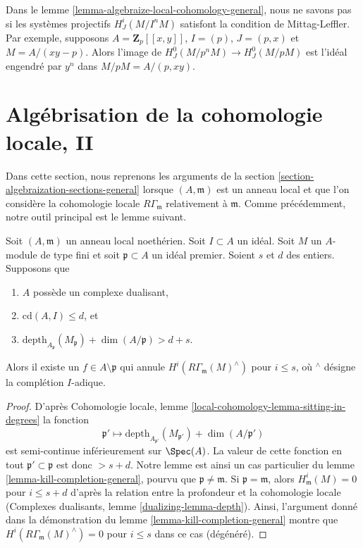 \begin{example}
\label{example-no-ML}
Dans le lemme \ref{lemma-algebraize-local-cohomology-general},
nous ne savons pas si les systèmes projectifs $H^i_J(M/I^nM)$ satisfont la
condition de Mittag-Leffler.
Par exemple, supposons $A = \mathbf{Z}_p[[x, y]]$, $I = (p)$,
$J = (p, x)$ et $M = A/(xy - p)$. Alors l'image de
$H^0_J(M/p^nM) \to H^0_J(M/pM)$
est l'idéal engendré par $y^n$ dans $M/pM = A/(p, xy)$.
\end{example}





\section{Algébrisation de la cohomologie locale, II}
\label{section-algebraization-punctured}

\noindent
Dans cette section, nous reprenons les arguments de la
section \ref{section-algebraization-sections-general}
lorsque $(A, \mathfrak m)$ est un anneau local et que l'on considère la cohomologie locale
$R\Gamma_\mathfrak m$ relativement à $\mathfrak m$. Comme précédemment, notre
outil principal est le lemme suivant.

\begin{lemma}
\label{lemma-kill-completion}
Soit $(A, \mathfrak m)$ un anneau local noethérien.
Soit $I \subset A$ un idéal. Soit $M$ un $A$-module de type fini et
soit $\mathfrak p \subset A$ un idéal premier. Soient $s$ et $d$ des entiers. Supposons que
\begin{enumerate}
\item $A$ possède un complexe dualisant,
\item $\text{cd}(A, I) \leq d$, et
\item
$\text{depth}_{A_\mathfrak p}(M_\mathfrak p) + \dim(A/\mathfrak p) > d + s$.
\end{enumerate}
Alors il existe un $f \in A \setminus \mathfrak p$ qui annule
$H^i(R\Gamma_\mathfrak m(M)^\wedge)$ pour $i \leq s$, où ${}^\wedge$
désigne la complétion $I$-adique.
\end{lemma}

\begin{proof}
D'après Cohomologie locale, lemme
\ref{local-cohomology-lemma-sitting-in-degrees}
la fonction
$$
\mathfrak p' \longmapsto
\text{depth}_{A_{\mathfrak p'}}(M_{\mathfrak p'}) + \dim(A/\mathfrak p')
$$
est semi-continue inférieurement sur $\Spec(A)$. La valeur
de cette fonction en tout $\mathfrak p' \subset \mathfrak p$
est donc $> s + d$. Notre lemme est ainsi un cas particulier du
lemme \ref{lemma-kill-completion-general},
pourvu que $\mathfrak p \not = \mathfrak m$.
Si $\mathfrak p = \mathfrak m$,
alors $H^i_\mathfrak m(M) = 0$ pour $i \leq s + d$ d'après
la relation entre la profondeur et la cohomologie locale
(Complexes dualisants, lemme \ref{dualizing-lemma-depth}).
Ainsi, l'argument donné dans la démonstration du
lemme \ref{lemma-kill-completion-general}
montre que $H^i(R\Gamma_\mathfrak m(M)^\wedge) = 0$
pour $i \leq s$ dans ce cas (dégénéré).
\end{proof}

